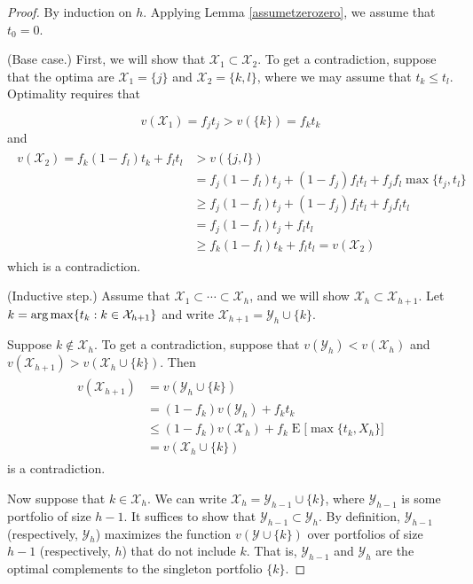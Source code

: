 \begin{proof}
By induction on $h$. Applying Lemma \ref{assumetzerozero}, we assume that $t_0 = 0$. 

(Base case.) First, we will show that $\mathcal{X}_1 \subset \mathcal{X}_2$. To get a contradiction, suppose that the optima are $\mathcal{X}_1 = \{j\}$ and $\mathcal{X}_2 = \{k, l\}$, where we may assume that $t_k \leq t_l$. Optimality requires that

\begin{equation}v(\mathcal{X}_1 )  = f_j t_j > v(\{k\}) = f_k t_k\end{equation}
and
\begin{align}
\begin{split}
v(\mathcal{X}_2) =  f_k (1- f_l) t_k + f_l t_l &> v(\{j, l\}) \\
& = f_j (1- f_l) t_j + (1- f_j) f_l t_l + f_j f_l \max\{t_j, t_l\} \\
&\geq  f_j (1- f_l) t_j + (1- f_j) f_l t_l + f_j f_l  t_l \\
&= f_j (1- f_l) t_j + f_l t_l  \\
&\geq f_k (1- f_l) t_k + f_l t_l  = v(\mathcal{X}_2)
\end{split}
\end{align}
which is a contradiction. 

(Inductive step.) Assume that $\mathcal{X}_1 \subset \cdots \subset \mathcal{X}_h$, and we will show $\mathcal{X}_h \subset \mathcal{X}_{h+1}$. Let $k = \operatorname*{arg\,max}\{ t_k: k \in \mathcal{X}_{h+1}\}$ and write $\mathcal{X}_{h+1} = \mathcal{Y}_{h} \cup \{k\}$.

Suppose $k \notin \mathcal{X}_h$. To get a contradiction, suppose that $v(\mathcal{Y}_h) < v(\mathcal{X}_h)$ and  $v(\mathcal{X}_{h+1}) > v(\mathcal{X}_h \cup \{k\})$. Then
\begin{align}
\begin{split}
v(\mathcal{X}_{h+1})&= v(\mathcal{Y}_{h} \cup \{k\}) \\
&= (1 - f_k) v(\mathcal{Y}_h) + f_k t_k \\
&\leq (1 - f_k) v(\mathcal{X}_h) + f_k \operatorname{E}\bigl[ \max\{t_k, X_h\}\bigr]\\
&=  v(\mathcal{X}_h\cup \{k\})
\end{split}
\end{align}
is a contradiction.

Now suppose that $k \in \mathcal{X}_h$. We can write $\mathcal{X}_h = \mathcal{Y}_{h-1} \cup \{k\}$, where $ \mathcal{Y}_{h-1}$ is some portfolio of size $h-1$. It suffices to show that $ \mathcal{Y}_{h-1} \subset \mathcal{Y}_h$. By definition, $\mathcal{Y}_{h-1}$ (respectively, $\mathcal{Y}_{h}$) maximizes the function $v(\mathcal{Y}\cup\{k\})$ over portfolios of size $h-1$ (respectively, $h$) that do not include $k$. That is, $\mathcal{Y}_{h-1}$ and $\mathcal{Y}_h$ are the optimal complements to the singleton portfolio $\{k\}$.


\end{proof}
